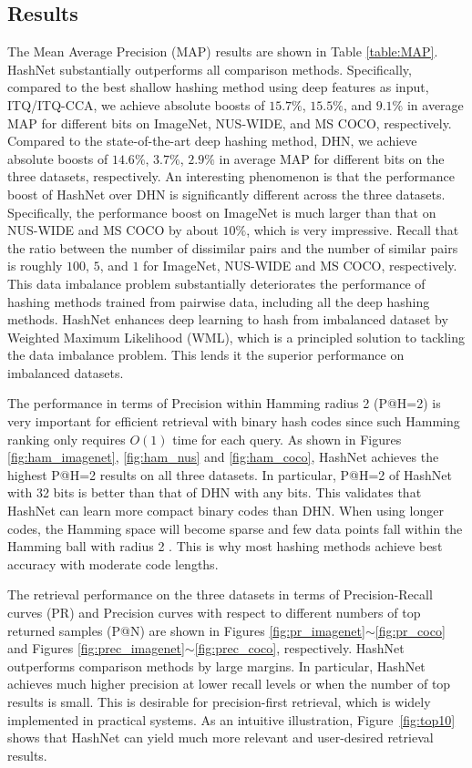 \documentclass[10pt,twocolumn,letterpaper]{article}
\begin{document}
\subsection{Results}
The Mean Average Precision (MAP) results are shown in Table \ref{table:MAP}. HashNet substantially outperforms all comparison methods. Specifically, compared to the best shallow hashing method using deep features as input, ITQ/ITQ-CCA, we achieve absolute boosts of $15.7\%$, $15.5\%$, and $9.1\%$ in average MAP for different bits on ImageNet, NUS-WIDE, and MS COCO, respectively. Compared to the state-of-the-art deep hashing method, DHN, we achieve absolute boosts of $14.6\%$, $3.7\%$, $2.9\%$ in average MAP for different bits on the three datasets, respectively. An interesting phenomenon is that the performance boost of HashNet over DHN is significantly different across the three datasets. Specifically, the performance boost on ImageNet is much larger than that on NUS-WIDE and MS COCO by about $10\%$, which is very impressive. Recall that the ratio between the number of dissimilar pairs and the number of similar pairs is roughly $100$, $5$, and $1$ for ImageNet, NUS-WIDE and MS COCO, respectively. This data imbalance problem substantially deteriorates the performance of hashing methods trained from pairwise data, including all the deep hashing methods. HashNet enhances deep learning to hash from imbalanced dataset by Weighted Maximum Likelihood (WML), which is a principled solution to tackling the data imbalance problem. This lends it the superior performance on imbalanced datasets. 

The performance in terms of Precision within Hamming radius 2 (P@H=2) is very important for efficient retrieval with binary hash codes since such Hamming ranking only requires $O(1)$ time for each query. As shown in Figures \ref{fig:ham_imagenet}, \ref{fig:ham_nus} and \ref{fig:ham_coco}, HashNet achieves the highest P@H=2 results on all three datasets. In particular, P@H=2 of HashNet with 32 bits is better than that of DHN with any bits. This validates that HashNet can learn more compact binary codes than DHN. When using longer codes, the Hamming space will become sparse and few data points fall within the Hamming ball with radius 2 \cite{cite:CVPR12MIH}. This is why most hashing methods achieve best accuracy with moderate code lengths.

The retrieval performance on the three datasets in terms of Precision-Recall curves (PR) and Precision curves with respect to different numbers of top returned samples (P@N) are shown in Figures \ref{fig:pr_imagenet}$\sim$\ref{fig:pr_coco} and Figures \ref{fig:prec_imagenet}$\sim$\ref{fig:prec_coco}, respectively. HashNet outperforms comparison methods by large margins. In particular, HashNet achieves much higher precision at lower recall levels or when the number of top results is small. This is desirable for precision-first retrieval, which is widely implemented in practical systems. As an intuitive illustration, Figure~\ref{fig:top10} shows that HashNet can yield much more relevant and user-desired retrieval results. 
\end{document}
